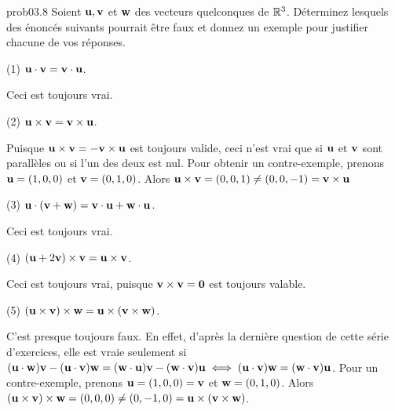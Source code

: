 \bigskip
\begin{sol}{prob03.8} Soient $\mathbf{u}, \mathbf{v}$ et $\mathbf{w}$ des vecteurs quelconques de $\mathbb{R}^3$.  Déterminez lesquels des \'enonc\'es suivants pourrait être faux et donnez un exemple pour justifier chacune de vos réponses.
 \medskip

(1) $\mathbf{u}\cdot \mathbf{v}=\mathbf{v}\cdot \mathbf{u}$. 

\soln Ceci est toujours vrai.

\medskip

(2) $\mathbf{u}\times \mathbf{v}=\mathbf{v}\times \mathbf{u}$. 

\soln Puisque $\mathbf{u}\times \mathbf{v}=- \mathbf{v}\times \mathbf{u}$ est toujours valide, ceci n'est vrai que si $\mathbf{u}$ et $\mathbf{v}$ sont parallèles ou si l'un des deux est nul. Pour obtenir un contre-exemple, prenons $\mathbf{u}=(1,0,0)$ et $\mathbf{v}=(0,1,0)$. Alors $\mathbf{u}\times \mathbf{v}=(0,0,1)\not=(0,0,-1)=\mathbf{v} \times \mathbf{u}$

\medskip

(3) $\mathbf{u}\cdot(\mathbf{v}+\mathbf{w})=\mathbf{v}\cdot \mathbf{u}+\mathbf{w}\cdot \mathbf{u}$. 

\soln Ceci est toujours vrai. 

\medskip

(4) $(\mathbf{u}+2\mathbf{v})\times \mathbf{v}=\mathbf{u}\times \mathbf{v}$.

 \soln Ceci est toujours vrai, puisque $\mathbf{v}\times \mathbf{v}=\mathbf{0}$ est toujours valable.

\medskip

(5) $(\mathbf{u}\times \mathbf{v})\times \mathbf{w}=\mathbf{u}\times(\mathbf{v}\times \mathbf{w})$. 

\soln C'est presque toujours faux. En effet, d'après la dernière question de cette série d'exercices, elle est vraie seulement si $(\mathbf{u} \cdot \mathbf{w})\mathbf{v}- (\mathbf{u}\cdot \mathbf{v}) \mathbf{w} = (\mathbf{w}\cdot \mathbf{u}) \mathbf{v}- (\mathbf{w}\cdot \mathbf{v}) \mathbf{u} \iff (\mathbf{u}\cdot \mathbf{v}) \mathbf{w} = (\mathbf{w}\cdot \mathbf{v}) \mathbf{u}$. Pour un contre-exemple, prenons $\mathbf{u}=(1,0,0)=\mathbf{v}$ et $\mathbf{w}=(0,1,0)$. Alors $(\mathbf{u}\times \mathbf{v})\times \mathbf{w}=(0,0,0) \not=(0,-1,0)=\mathbf{u}\times(\mathbf{v}\times \mathbf{w})$.
\medskip

\end{sol}

